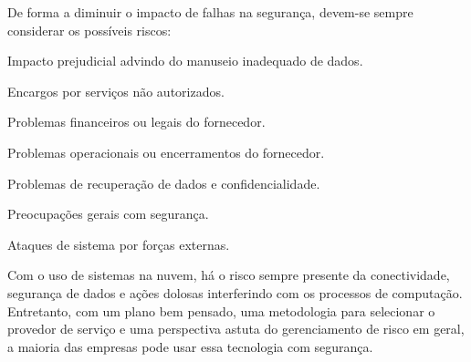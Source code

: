 De forma a diminuir o impacto de falhas na segurança, devem-se sempre considerar os
possíveis riscos:
\begin{itemise}
    \item Impacto prejudicial advindo do manuseio inadequado de dados.
    \item Encargos por serviços não autorizados.
    \item Problemas financeiros ou legais do fornecedor.
    \item Problemas operacionais ou encerramentos do fornecedor.
    \item Problemas de recuperação de dados e confidencialidade.
    \item Preocupações gerais com segurança.
    \item Ataques de sistema por forças externas.
\end{itemise}

Com o uso de sistemas na nuvem, há o risco sempre presente da conectividade,
segurança de dados e ações dolosas interferindo com os processos de computação.
Entretanto, com um plano bem pensado, uma metodologia para selecionar o provedor
de serviço e uma perspectiva astuta do gerenciamento de risco em geral, a maioria
das empresas pode usar essa tecnologia com segurança. 
